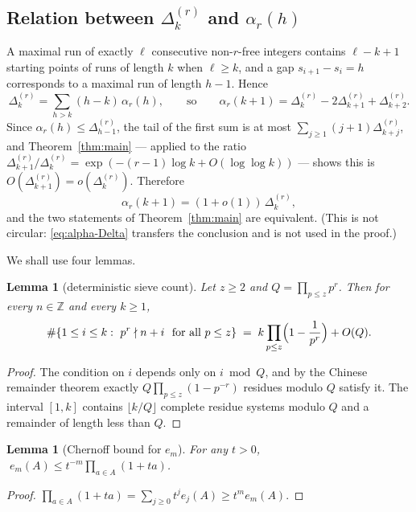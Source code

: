 \documentclass[11pt,reqno]{amsart}
\theoremstyle{plain}
\newtheorem{lemma}[theorem]{Lemma}
\theoremstyle{definition}
\numberwithin{equation}{section}
\newcommand{\Z}{\mathbb{Z}}
\begin{document}
\subsection*{Relation between $\Delta^{(r)}_k$ and $\alpha_r(h)$}
A maximal run of exactly $\ell$ consecutive non-$r$-free integers contains $\ell-k+1$
starting points of runs of length $k$ when $\ell\ge k$, and a gap $s_{i+1}-s_i=h$
corresponds to a maximal run of length $h-1$. Hence
\begin{equation}\label{eq:D-alpha}
  \Delta^{(r)}_k=\sum_{h>k}(h-k)\,\alpha_r(h),\qquad\text{so}\qquad
  \alpha_r(k+1)=\Delta^{(r)}_k-2\Delta^{(r)}_{k+1}+\Delta^{(r)}_{k+2}.
\end{equation}
Since $\alpha_r(h)\le\Delta^{(r)}_{h-1}$, the tail of the first sum is at most
$\sum_{j\ge1}(j+1)\Delta^{(r)}_{k+j}$, and Theorem~\ref{thm:main} --- applied to the ratio
$\Delta^{(r)}_{k+1}/\Delta^{(r)}_k=\exp(-(r-1)\log k+O(\log\log k))$ --- shows this is
$O(\Delta^{(r)}_{k+1})=o(\Delta^{(r)}_k)$. Therefore
\begin{equation}\label{eq:alpha-Delta}
  \alpha_r(k+1)=(1+o(1))\,\Delta^{(r)}_k ,
\end{equation}
and the two statements of Theorem~\ref{thm:main} are equivalent. (This is not circular:
\eqref{eq:alpha-Delta} transfers the conclusion and is not used in the proof.)

We shall use four lemmas.

\begin{lemma}[deterministic sieve count]\label{lem:sieve}
Let $z\ge2$ and $Q=\prod_{p\le z}p^{r}$. Then for every $n\in\Z$ and every $k\ge1$,
\[
  \#\{1\le i\le k:\ p^{r}\nmid n+i\ \text{ for all } p\le z\}
  \;=\;k\prod_{p\le z}\Bigl(1-\frac1{p^{r}}\Bigr)+O(Q).
\]
\end{lemma}

\begin{proof}
The condition on $i$ depends only on $i\bmod Q$, and by the Chinese remainder theorem
exactly $Q\prod_{p\le z}(1-p^{-r})$ residues modulo $Q$ satisfy it. The interval $[1,k]$
contains $\lfloor k/Q\rfloor$ complete residue systems modulo $Q$ and a remainder of length
less than $Q$.
\end{proof}

\begin{lemma}[Chernoff bound for $e_m$]\label{lem:chernoff}
For any $t>0$, $\;e_m(A)\le t^{-m}\prod_{a\in A}(1+ta)$.
\end{lemma}

\begin{proof}
$\prod_{a\in A}(1+ta)=\sum_{j\ge0}t^{j}e_j(A)\ge t^{m}e_m(A)$.
\end{proof}
\end{document}
